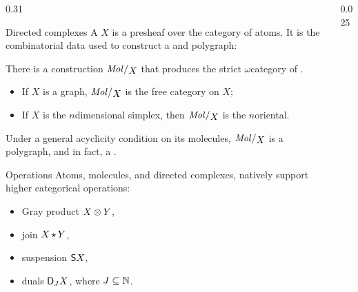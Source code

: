 \begin{columns}[t,totalwidth=\textwidth]
\begin{column}{0.31\textwidth}
\vspace{-1em}
\begin{block}{Directed complexes}
    A  \( X \) is a presheaf over the category of atoms.
    It is the combinatorial data used to construct a  and  polygraph:
    \begin{center}
    \end{center}
    There is a construction \( \molecin{X} \) that produces the strict \( \omega \)\nbd category of .
    \begin{itemize}
      \item If \( X \) is a graph, \( \molecin{X} \) is the free category on \( X \);
      \item If \( X \) is the \( n \)\nbd dimensional simplex, then \( \molecin{X} \) is the \( n \)\nbd oriental.  
    \end{itemize}
     Under a general acyclicity condition on its molecules, \( \molecin{X} \) is a polygraph, and in fact, a .
\end{block}

\begin{block} {Operations}
  Atoms, molecules, and directed complexes, natively support higher categorical operations:
  \begin{itemize}
    \item Gray product \( X \otimes Y \),
    \item join \( X \,{\star}\, Y \),
    \item suspension \( \mathsf{S}{X} \),
    \item duals \( \mathsf{D}_J X \), where \( J \subseteq \mathbb{N} \).
  \end{itemize}
\end{block}
\end{column}

\begin{column}{0.025\textwidth}
\end{column}


\end{columns}
